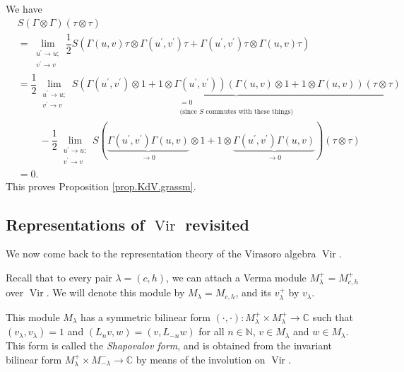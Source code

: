 \documentclass
[numbers=enddot,12pt,final,onecolumn,german,notitlepage]{scrartcl}%
\theoremstyle{definition}
\begin{document}
We have
\begin{align*}
&  S\left(  \Gamma\otimes\Gamma\right)  \left(  \tau\otimes\tau\right) \\
&  =\lim\limits_{\substack{u^{\prime}\rightarrow u;\\v^{\prime}\rightarrow
v}}\dfrac{1}{2}S\left(  \Gamma\left(  u,v\right)  \tau\otimes\Gamma\left(
u^{\prime},v^{\prime}\right)  \tau+\Gamma\left(  u^{\prime},v^{\prime}\right)
\tau\otimes\Gamma\left(  u,v\right)  \tau\right) \\
&  =\dfrac{1}{2}\lim\limits_{\substack{u^{\prime}\rightarrow u;\\v^{\prime
}\rightarrow v}}\underbrace{S\left(  \Gamma\left(  u^{\prime},v^{\prime
}\right)  \otimes1+1\otimes\Gamma\left(  u^{\prime},v^{\prime}\right)
\right)  \left(  \Gamma\left(  u,v\right)  \otimes1+1\otimes\Gamma\left(
u,v\right)  \right)  \left(  \tau\otimes\tau\right)  }%
_{\substack{=0\\\text{(since }S\text{ commutes with these things)}}}\\
&  \ \ \ \ \ \ \ \ \ \ -\dfrac{1}{2}\lim\limits_{\substack{u^{\prime
}\rightarrow u;\\v^{\prime}\rightarrow v}}S\left(  \underbrace{\Gamma\left(
u^{\prime},v^{\prime}\right)  \Gamma\left(  u,v\right)  }_{\rightarrow
0}\otimes1+1\otimes\underbrace{\Gamma\left(  u^{\prime},v^{\prime}\right)
\Gamma\left(  u,v\right)  }_{\rightarrow0}\right)  \left(  \tau\otimes
\tau\right) \\
&  =0.
\end{align*}
This proves Proposition \ref{prop.KdV.grassm}.

\subsection{Representations of $\operatorname*{Vir}$ revisited}

We now come back to the representation theory of the Virasoro algebra
$\operatorname*{Vir}$.

Recall that to every pair $\lambda=\left(  c,h\right)  $, we can attach a
Verma module $M_{\lambda}^{+}=M_{c,h}^{+}$ over $\operatorname*{Vir}$. We will
denote this module by $M_{\lambda}=M_{c,h}$, and its $v_{\lambda}^{+}$ by
$v_{\lambda}$.

This module $M_{\lambda}$ has a symmetric bilinear form $\left(  \cdot
,\cdot\right)  :M_{\lambda}^{+}\times M_{\lambda}^{+}\rightarrow\mathbb{C}$
such that $\left(  v_{\lambda},v_{\lambda}\right)  =1$ and $\left(
L_{n}v,w\right)  =\left(  v,L_{-n}w\right)  $ for all $n\in\mathbb{N}$, $v\in
M_{\lambda}$ and $w\in M_{\lambda}$. This form is called the
\textit{Shapovalov form}, and is obtained from the invariant bilinear form
$M_{\lambda}^{+}\times M_{-\lambda}^{-}\rightarrow\mathbb{C}$ by means of the
involution on $\operatorname*{Vir}$.
\end{document}
